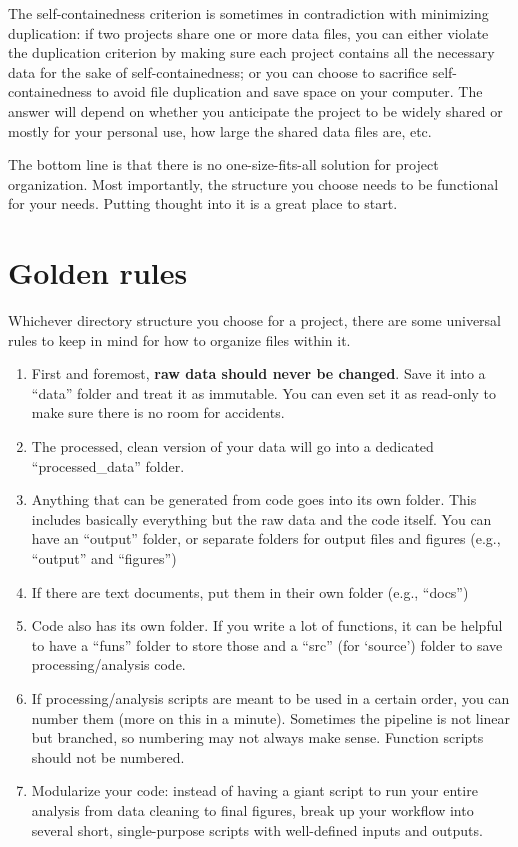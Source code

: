 \documentclass[
]{book}
\begin{document}
The self-containedness criterion is sometimes in contradiction with minimizing duplication: if two projects share one or more data files, you can either violate the duplication criterion by making sure each project contains all the necessary data for the sake of self-containedness; or you can choose to sacrifice self-containedness to avoid file duplication and save space on your computer. The answer will depend on whether you anticipate the project to be widely shared or mostly for your personal use, how large the shared data files are, etc.

The bottom line is that there is no one-size-fits-all solution for project organization. Most importantly, the structure you choose needs to be functional for your needs. Putting thought into it is a great place to start.

\hypertarget{golden-rules}{%
\section{Golden rules}\label{golden-rules}}

Whichever directory structure you choose for a project, there are some universal rules to keep in mind for how to organize files within it.

\begin{enumerate}
\def\labelenumi{\arabic{enumi}.}
\item
  First and foremost, \textbf{raw data should never be changed}. Save it into a ``data'' folder and treat it as immutable. You can even set it as read-only to make sure there is no room for accidents.
\item
  The processed, clean version of your data will go into a dedicated ``processed\_data'' folder.
\item
  Anything that can be generated from code goes into its own folder. This includes basically everything but the raw data and the code itself. You can have an ``output'' folder, or separate folders for output files and figures (e.g., ``output'' and ``figures'')
\item
  If there are text documents, put them in their own folder (e.g., ``docs'')
\item
  Code also has its own folder. If you write a lot of functions, it can be helpful to have a ``funs'' folder to store those and a ``src'' (for `source') folder to save processing/analysis code.
\item
  If processing/analysis scripts are meant to be used in a certain order, you can number them (more on this in a minute). Sometimes the pipeline is not linear but branched, so numbering may not always make sense. Function scripts should not be numbered.
\item
  Modularize your code: instead of having a giant script to run your entire analysis from data cleaning to final figures, break up your workflow into several short, single-purpose scripts with well-defined inputs and outputs.
\end{enumerate}
\end{document}
